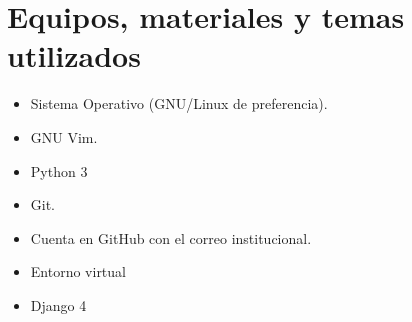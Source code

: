 \section{Equipos, materiales y temas utilizados}
\begin{itemize}
	\item Sistema Operativo (GNU/Linux de preferencia).
	\item GNU Vim.
	\item Python 3
	\item Git.
	\item Cuenta en GitHub con el correo institucional.
        \item Entorno virtual
        \item Django 4
\end{itemize}
